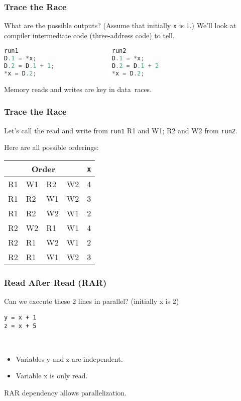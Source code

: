 \begin{frame}[fragile]
\frametitle{Trace the Race}

What are the possible outputs? (Assume that initially {\tt *x} is 1.)
We'll look at compiler intermediate code (three-address code) to tell.

\begin{lstlisting}[language=C]
run1                          run2   
D.1 = *x;                     D.1 = *x;
D.2 = D.1 + 1;                D.2 = D.1 + 2
*x = D.2;                     *x = D.2;
  \end{lstlisting}


Memory reads and writes are key in data~races.

\end{frame}



\begin{frame}
\frametitle{Trace the Race}
Let's call the read and write from {\tt run1} R1 and W1; R2 and W2
from {\tt run2}.

Here are all possible orderings:
  \begin{center}
    \begin{tabular}{llll|l}
\multicolumn{4}{c|}{Order} & {\tt *x}\\
\hline
R1 & W1 & R2 & W2 & 4 \\
R1 & R2 & W1 & W2 & 3 \\
R1 & R2 & W2 & W1 & 2 \\
R2 & W2 & R1 & W1 & 4 \\
R2 & R1 & W2 & W1 & 2 \\
R2 & R1 & W1 & W2 & 3 \\
    \end{tabular}
  \end{center}

\end{frame}

\begin{frame}[fragile]
\frametitle{Read After Read (RAR)}

Can we execute these 2 lines in parallel? (initially x is 2)
\begin{lstlisting}
y = x + 1
z = x + 5
\end{lstlisting}
\pause
{}\\[1em]
\begin{itemize}
\item Variables y and z are independent.
\item Variable x is only read.
\end{itemize}

RAR dependency allows parallelization.



\end{frame}

